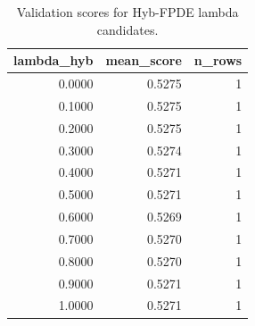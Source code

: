 \begin{table}[t]
\caption{Validation scores for Hyb-FPDE lambda candidates.}
\label{tab:lambda_distribution_computed}
\centering
\begin{tabular}{rrr}
\toprule
lambda\_hyb & mean\_score & n\_rows \\
\midrule
0.0000 & 0.5275 & 1 \\
0.1000 & 0.5275 & 1 \\
0.2000 & 0.5275 & 1 \\
0.3000 & 0.5274 & 1 \\
0.4000 & 0.5271 & 1 \\
0.5000 & 0.5271 & 1 \\
0.6000 & 0.5269 & 1 \\
0.7000 & 0.5270 & 1 \\
0.8000 & 0.5270 & 1 \\
0.9000 & 0.5271 & 1 \\
1.0000 & 0.5271 & 1 \\
\bottomrule
\end{tabular}

\end{table}
